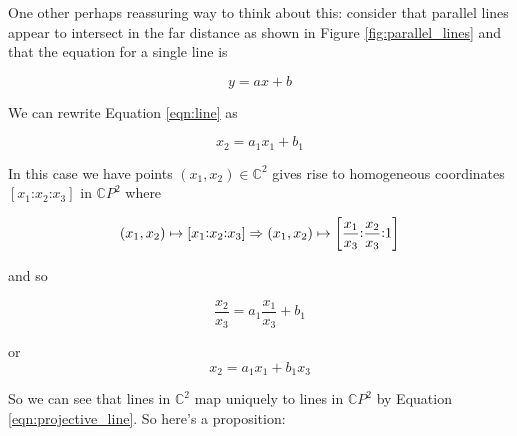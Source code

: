 \documentclass{article}
\theoremstyle{definition}
\begin{document}
\bigskip
\noindent
One other perhaps reassuring way to think about this: consider that parallel lines appear to intersect in the far distance as shown in Figure \ref{fig:parallel_lines} and
that the equation for a single line is

\begin{equation}
y = ax + b
\label{eqn:line}
\end{equation}

\bigskip
\noindent
We can rewrite Equation \ref{eqn:line} as 

\begin{equation*}
x_2 = a_1 x_1 + b_1
\end{equation*}

\bigskip
\noindent
In this case we have points $(x_1,x_2) \in \mathbb{C}^2$ gives rise to homogeneous coordinates $[x_1 \mathord{:}   x_2 \mathord{:}   x_3]$
in $\mathbb{C}P^2$ where

\bigskip
\begin{equation*}
(x_1,x_2) \mapsto [x_1  \mathord{:}  x_2  \mathord{:}  x_3] \Rightarrow \\
(x_1,x_2) \mapsto  \bigg [ \frac{x_1}{x_3}  \mathord{:}  \frac{x_2}{x_3}  \mathord{:}  1 \bigg ]
\end{equation*}

\bigskip
\noindent
and so

\bigskip
\begin{equation*}
\frac{x_2}{x_3} = a_1 \frac{x_1}{x_3} + b_1
\end{equation*}

\bigskip
\noindent
or 
\begin{equation}
x_2 = a_1 x_1 + b_1 x_3
\label{eqn:projective_line}
\end{equation}


\bigskip
\noindent
So we can see that lines in $\mathbb{C}^2$ map uniquely to lines in $\mathbb{C}P^2$ by Equation \ref{eqn:projective_line}. So here's a proposition:
\end{document}
